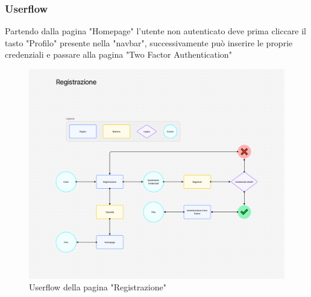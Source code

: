 \documentclass{report}
\begin{document}
\subsubsection*{Userflow}
Partendo dalla pagina "Homepage" l'utente non autenticato deve prima cliccare il tasto "Profilo" presente nella "navbar", successivamente può inserire le proprie credenziali e passare alla pagina "Two Factor Authentication"
\begin{figure}[H]
	\centering\includegraphics[width=1\textwidth]{images/microservizio-autenticazione/frontend/registrazione-userflow.png}
	Userflow della pagina "Registrazione"
\end{figure}
\end{document}
